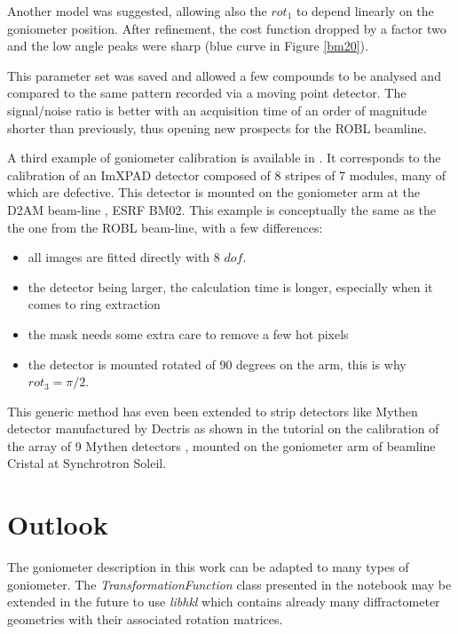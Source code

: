 \documentclass[preprint]{iucr}              %
\begin{document}
Another model was suggested, allowing also the $rot_1$ to depend linearly on the
goniometer position. 
After refinement, the cost function dropped by a factor two and
the low angle peaks were sharp (blue curve in Figure \ref{bm20}). 

This parameter set was saved and allowed a few compounds to be analysed and
compared to the same pattern recorded via a moving point detector. 
The signal/noise ratio is better with an acquisition time of an order
of magnitude shorter than previously, thus opening new prospects for
the ROBL beamline.

A third example of goniometer calibration is available in \cite{rotation_xpad}. 
It corresponds to the calibration of an ImXPAD detector \cite{BOUDET200341}
composed of 8 stripes of 7 modules, many of which are defective.
This detector is mounted on the goniometer arm at the D2AM beam-line
\cite{Ferrer:ri0008}, ESRF BM02. 
This example is conceptually the same as the the one from the ROBL beam-line,
with a few differences:
\begin{itemize}
  \item all images are fitted directly with 8 $dof$.
  \item the detector being larger, the calculation time is
        longer, especially when it comes to ring extraction
  \item the mask needs some extra care to remove a few hot pixels
  \item the detector is mounted rotated of 90 degrees on the arm, this is why
  $rot_3=\pi/2$.
\end{itemize}

This generic method has even been extended to strip detectors 
like Mythen detector manufactured by Dectris as shown in the tutorial on the 
calibration of the array of 9 Mythen detectors \cite{rotation_mythen}, mounted on 
the goniometer arm of beamline Cristal at Synchrotron Soleil.  

\section{Outlook}

The goniometer description in this work can be adapted to
many types of goniometer.
The \textit{TransformationFunction} class presented in the notebook may be extended
in the future to use \textit{libhkl} \cite{libhkl} which contains already many
diffractometer geometries with their associated rotation matrices. 
\end{document}
